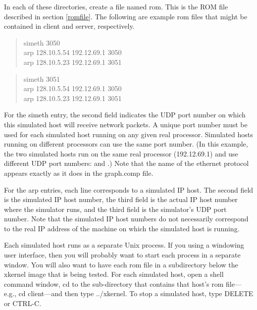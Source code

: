 In each of these directories, create a file named {\sanss rom}.  This
is the ROM file described in section \ref{romfile}. 
The following are example {\sanss rom} files that might be contained in
{\sanss client} and {\sanss server}, respectively.

\begin{quote}
\begin{tt}
simeth	3050\\
arp		128.10.5.54	192.12.69.1  3050\\
arp		128.10.5.23	192.12.69.1  3051\\
\end{tt}
\end{quote}

\begin{quote}
\begin{tt}
simeth	3051\\
arp	128.10.5.54     192.12.69.1  3050\\
arp	128.10.5.23	192.12.69.1  3051\\
\end{tt}
\end{quote}

\noindent
For the simeth entry, the second field indicates the UDP port number
on which this simulated host will receive network packets. A unique
port number must be used for each simulated host running on any given
real processor.  Simulated hosts running on different processors can
use the same port number. (In this example, the two simulated hosts
run on the same real processor (192.12.69.1) and use different UDP port
numbers: {} and {}.)  Note that the name of the
ethernet protocol appears exactly as it does in the {\sanss graph.comp}
file.

For the arp entries, each line corresponds to a simulated IP host.
The second field is the simulated IP host number, the third field is
the actual IP host number where the simulator runs, and the third
field is the simulator's UDP port number.  
Note that the simulated IP host numbers
do not necessarily correspond to the real IP address of the machine on
which the simulated host is running.

Each simulated host runs as a separate Unix process.  If you using a
windowing user interface, then you will probably want to start each
process in a separate window.  You will also want to have each {\sanss
rom} file in a subdirectory below the xkernel image that is being
tested.  For each simulated host, open a shell command window, {\sanss
cd} to the sub-directory that contains that host's {\sanss rom}
file---e.g., {\sanss cd client}---and then type {\sanss ../xkernel}.
To stop a simulated host, type {\sanss DELETE} or {\sanss CTRL-C}.

